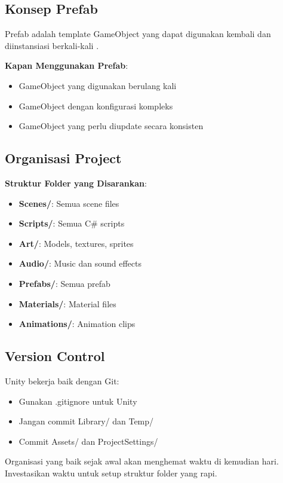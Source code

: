 \subsection{Konsep Prefab}

\begin{definisi}[Prefab]
Prefab adalah template GameObject yang dapat digunakan kembali dan diinstansiasi berkali-kali \cite{UnityManual2024}.
\end{definisi}

\textbf{Kapan Menggunakan Prefab}:
\begin{itemize}
\item GameObject yang digunakan berulang kali
\item GameObject dengan konfigurasi kompleks
\item GameObject yang perlu diupdate secara konsisten
\end{itemize}

\subsection{Organisasi Project}

\textbf{Struktur Folder yang Disarankan}:
\begin{itemize}
\item \textbf{Scenes/}: Semua scene files
\item \textbf{Scripts/}: Semua C\# scripts
\item \textbf{Art/}: Models, textures, sprites
\item \textbf{Audio/}: Music dan sound effects
\item \textbf{Prefabs/}: Semua prefab
\item \textbf{Materials/}: Material files
\item \textbf{Animations/}: Animation clips
\end{itemize}

\subsection{Version Control}

Unity bekerja baik dengan Git:
\begin{itemize}
\item Gunakan .gitignore untuk Unity
\item Jangan commit Library/ dan Temp/
\item Commit Assets/ dan ProjectSettings/
\end{itemize}

\begin{catatan}
Organisasi yang baik sejak awal akan menghemat waktu di kemudian hari. Investasikan waktu untuk setup struktur folder yang rapi.
\end{catatan}
